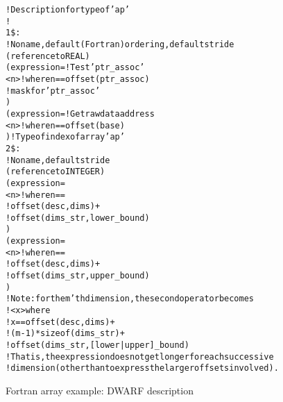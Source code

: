 \begin{figure}[h]
\begin{dwflisting}
\begin{alltt}
! Description for type of 'ap'
!
1\$: 
        ! No name, default (Fortran) ordering, default stride
        (reference to REAL)
        (expression= ! Test 'ptr\_assoc' 
            <n>    ! where n == offset(ptr\_assoc)
                  ! mask for 'ptr\_assoc' 
            )
        (expression= ! Get raw data address
            <n>    ! where n == offset(base)
            )    ! Type of index of array 'ap'
2\$:     
            ! No name, default stride
            (reference to INTEGER)
            (expression=
                <n> ! where n ==
                             !  offset(desc, dims) +
                             !  offset(dims\_str, lower\_bound)
                )
            (expression=
                <n> ! where n ==
                             !  offset(desc, dims) +
                             !  offset(dims\_str, upper\_bound)
                )
            !  Note: for the m'th dimension, the second operator becomes
            !  <x> where
            !       x == offset(desc, dims)          +
            !                (m-1)*sizeof(dims\_str) +
            !                 offset(dims\_str, [lower|upper]\_bound)
            !  That is, the expression does not get longer for each successive 
            !  dimension (other than to express the larger offsets involved).
\end{alltt}
\end{dwflisting}
\caption{Fortran array example: DWARF description}
\label{fig:fortranarrayexampledwarfdescription}
\end{figure}

